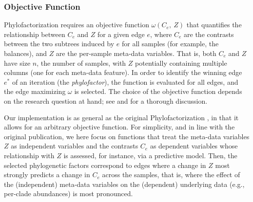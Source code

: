 
\subsubsection*{Objective Function}
\label{sec:Factorization:sub:PhyloFactorization:sub:ObjectiveFunction}


Phylofactorization requires an objective function $\omega(C_e, ~Z)$
that quantifies the relationship between $C_e$ and $Z$ for a given edge $e$,
where $C_e$ are the contrasts between the two subtrees induced by $e$ for all samples (for example, the balances),
and $Z$ are the per-sample meta-data variables.
That is, both $C_e$ and $Z$ have size $n$, the number of samples,
with $Z$ potentially containing multiple columns (one for each meta-data feature).
In order to identify the winning edge $e^*$ of an iteration (the \emph{phylofactor}),
the function is evaluated for all edges, and the edge maximizing $\omega$ is selected.
The choice of the objective function depends on the research question at hand;
see \cite{Washburne2017a} and \cite{Washburne2018} for a thorough discussion.

Our implementation is as general as the original Phylofactorization \cite{Washburne2017a},
in that it allows for an arbitrary objective function.
For simplicity, and in line with the original publication,
we here focus on functions that treat the meta-data variables $Z$ as independent variables
and the contrasts $C_e$ as dependent variables whose relationship with $Z$ is assessed, for instance, via a predictive model.
Then, the selected phylogenetic factors correspond to edges
where a change in $Z$ most strongly predicts a change in $C_e$ across the samples,
that is, where the effect of the (independent) meta-data variables
on the (dependent) underlying data (e.g., per-clade abundances) is most pronounced.

